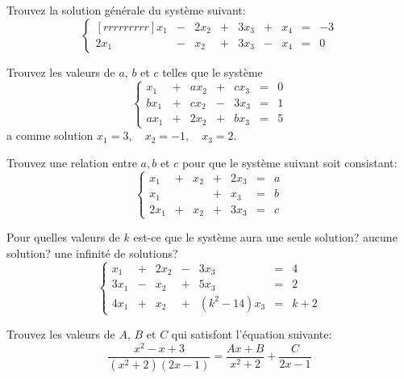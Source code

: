 \pagebreak
\begin{TwoCol}
\begin{exercice}
	Trouvez la solution générale du système suivant:
	\[
	\left\{\begin{matrix}[rrrrrrrrr]
	x_1 &-& 2x_2 &+& 3x_3 &+& x_4 &=& -3 \\
	2x_1 &-& x_2 &+& 3x_3 &-& x_4 &=& 0
	\end{matrix}
	\right.
	\]
\end{exercice}

\begin{exercice}
	Trouvez les valeurs de $a$, $b$ et $c$ telles que le système
	\[
	\left\{\begin{matrix}
	x_1 &+& ax_2 &+& cx_3 &=& 0 \\
	bx_1 &+& cx_2 &-& 3x_3 &=& 1 \\
	ax_1 &+& 2x_2 &+& bx_3 &=& 5
	\end{matrix}
	\right.
	\]
	a comme solution $x_1=3, \quad x_2=-1, \quad x_3=2$.
\end{exercice}

\begin{exercice}
	Trouvez une relation entre $a, b$ et $c$ pour que le système suivant soit consistant:
	\[
	\left\{\begin{matrix}
	x_1 &+& x_2 &+& 2x_3 &=& a \\
	x_1 &&  &+& x_3 &=& b \\
	2x_1 &+& x_2 &+& 3x_3 &=& c
	\end{matrix}
	\right.
	\]
\end{exercice}

\begin{exercice}
	Pour quelles valeurs de $k$ est-ce que le système aura
	 une seule solution?
	 aucune solution?
	 une infinité de solutions?
	\[
	\left\{\begin{matrix}
	x_1 &+& 2x_2 &-& 3x_3 &=& 4 \\
	3x_1 &-&x_2  &+& 5x_3 &=& 2 \\
	4x_1 &+& x_2 &+& (k^2-14)x_3 &=& k+2
	\end{matrix}
	\right.
	\]
\end{exercice}

\begin{exercice}
	Trouvez les valeurs de $A$, $B$ et $C$ qui satisfont l'équation suivante:
	\[
	\frac{x^2 -x+3}{(x^2+2)(2x-1)} = \frac{A x+B}{x^2+2} + \frac{C}{2x-1}
	\]
\end{exercice}


\end{TwoCol}
